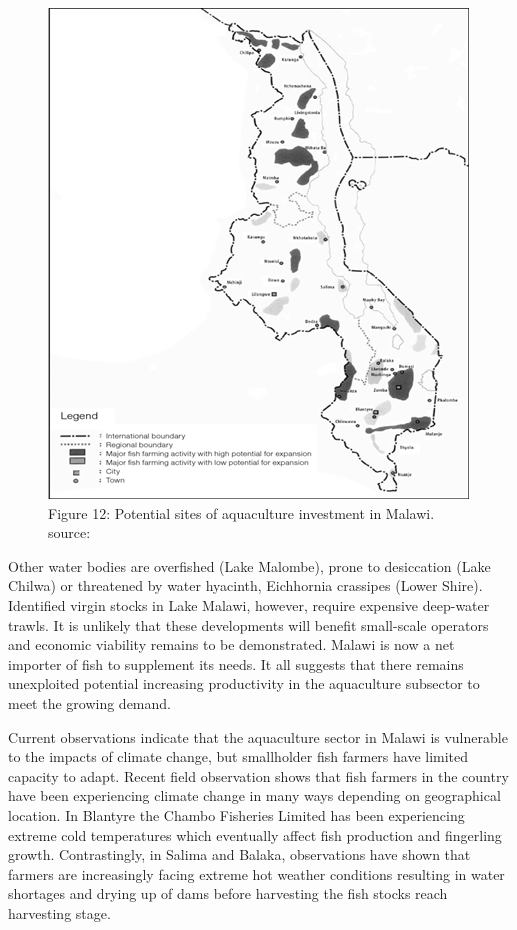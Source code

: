 \documentclass[
]{book}
\begin{document}
\begin{figure}
\centering
\includegraphics{images/aquacilture_invest.png}
\caption{Figure 12: Potential sites of aquaculture investment in Malawi. source:}
\end{figure}

Other water bodies are overfished (Lake Malombe), prone to desiccation (Lake Chilwa) or threatened by water hyacinth, Eichhornia crassipes (Lower Shire). Identified virgin stocks in Lake Malawi, however, require expensive deep-water trawls. It is unlikely that these developments will benefit small-scale operators and economic viability remains to be demonstrated. Malawi is now a net importer of fish to supplement its needs. It all suggests that there remains unexploited potential increasing productivity in the aquaculture subsector to meet the growing demand.

Current observations indicate that the aquaculture sector in Malawi is vulnerable to the impacts of climate change, but smallholder fish farmers have limited capacity to adapt. Recent field observation shows that fish farmers in the country have been experiencing climate change in many ways depending on geographical location. In Blantyre the Chambo Fisheries Limited has been experiencing extreme cold temperatures which eventually affect fish production and fingerling growth. Contrastingly, in Salima and Balaka, observations have shown that farmers are increasingly facing extreme hot weather conditions resulting in water shortages and drying up of dams before harvesting the fish stocks reach harvesting stage.
\end{document}
